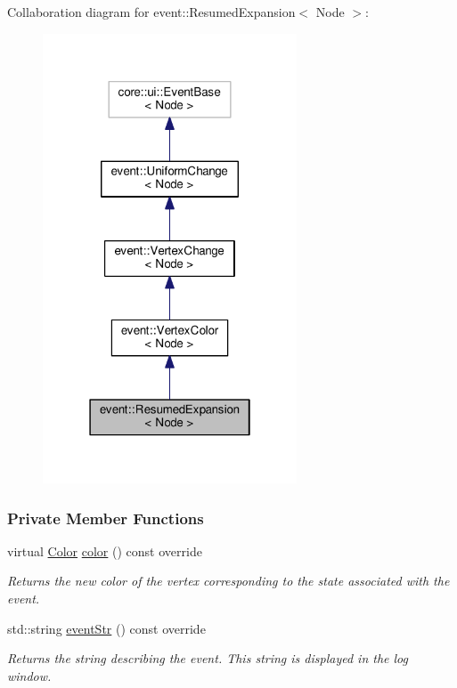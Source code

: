 Collaboration diagram for event\+:\+:Resumed\+Expansion$<$ Node $>$\+:\nopagebreak
\begin{figure}[H]
\begin{center}
\leavevmode
\includegraphics[width=214pt]{structevent_1_1ResumedExpansion__coll__graph}
\end{center}
\end{figure}
\subsubsection*{Private Member Functions}
\begin{DoxyCompactItemize}
\item 
virtual \hyperlink{colors_8h_ab87bacfdad76e61b9412d7124be44c1c}{Color} \hyperlink{structevent_1_1ResumedExpansion_abfe2350951662756ec5ed9fcbed0e212}{color} () const override
\begin{DoxyCompactList}\small\item\em Returns the new color of the vertex corresponding to the state associated with the event. \end{DoxyCompactList}\item 
std\+::string \hyperlink{structevent_1_1ResumedExpansion_afd56106125054c2d147bb1eef793d444}{event\+Str} () const override
\begin{DoxyCompactList}\small\item\em Returns the string describing the event. This string is displayed in the log window. \end{DoxyCompactList}\end{DoxyCompactItemize}
